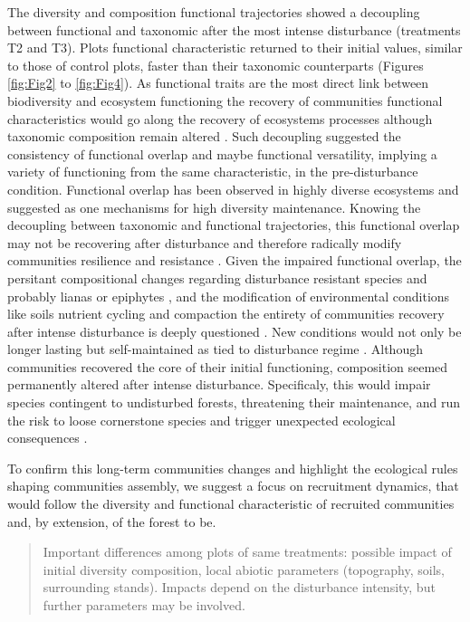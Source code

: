 \documentclass[fleqn,10pt]{ArtEcoFoG} %
\theoremstyle{definition}
\theoremstyle{definition}
\theoremstyle{definition}
\theoremstyle{remark}
\begin{document}
The diversity and composition functional trajectories showed a
decoupling between functional and taxonomic after the most intense
disturbance (treatments T2 and T3). Plots functional characteristic
returned to their initial values, similar to those of control plots,
faster than their taxonomic counterparts (Figures \ref{fig:Fig2} to
\ref{fig:Fig4}). As functional traits are the most direct link between
biodiversity and ecosystem functioning \citep{Diaz2005} the recovery of
communities functional characteristics would go along the recovery of
ecosystems processes although taxonomic composition remain altered
\citep{Guariguata2001}. Such decoupling suggested the consistency of
functional overlap and maybe functional versatility, implying a variety
of functioning from the same characteristic, in the pre-disturbance
condition. Functional overlap has been observed in highly diverse
ecosystems \citep{Bellwood2006} and suggested as one mechanisms for high
diversity maintenance. Knowing the decoupling between taxonomic and
functional trajectories, this functional overlap may not be recovering
after disturbance and therefore radically modify communities resilience
and resistance \citep{Trenbath1999, Elmqvist2003, Diaz2005}. Given the
impaired functional overlap, the persitant compositional changes
regarding disturbance resistant species \citep{Haddad2008} and probably
lianas or epiphytes \citep{Martin2013}, and the modification of
environmental conditions like soils nutrient cycling and compaction
\citep{Olander2005} the entirety of communities recovery after intense
disturbance is deeply questioned \citep{Chazdon2003a}. New conditions
would not only be longer lasting but self-maintained as tied to
disturbance regime \citep{Burslem2000}. Although communities recovered
the core of their initial functioning, composition seemed permanently
altered after intense disturbance. Specificaly, this would impair
species contingent to undisturbed forests, threatening their
maintenance, and run the risk to loose cornerstone species and trigger
unexpected ecological consequences \citep{Diaz2005, Gardner2007}.

To confirm this long-term communities changes and highlight the
ecological rules shaping communities assembly, we suggest a focus on
recruitment dynamics, that would follow the diversity and functional
characteristic of recruited communities and, by extension, of the forest
to be.

\begin{quote}
Important differences among plots of same treatments: possible impact of
initial diversity composition, local abiotic parameters (topography,
soils, surrounding stands). Impacts depend on the disturbance intensity,
but further parameters may be involved.
\end{quote}
\end{document}
